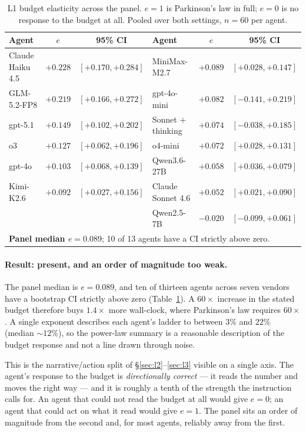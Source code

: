 \begin{table}[h]
\centering\small
\caption{L1 budget elasticity across the panel. $e = 1$ is Parkinson's law in
full; $e = 0$ is no response to the budget at all. Pooled over both settings,
$n = 60$ per agent.}
\label{tab:l1-elasticity}
\begin{tabular}{lcc|lcc}
\toprule
Agent & $e$ & 95\% CI & Agent & $e$ & 95\% CI \\
\midrule
Claude Haiku 4.5 & $+0.228$ & $[+0.170, +0.284]$ & MiniMax-M2.7   & $+0.089$ & $[+0.028, +0.147]$ \\
GLM-5.2-FP8      & $+0.219$ & $[+0.166, +0.272]$ & gpt-4o-mini    & $+0.082$ & $[-0.141, +0.219]$ \\
gpt-5.1          & $+0.149$ & $[+0.102, +0.202]$ & Sonnet $+$ thinking & $+0.074$ & $[-0.038, +0.185]$ \\
o3               & $+0.127$ & $[+0.062, +0.196]$ & o4-mini        & $+0.072$ & $[+0.028, +0.131]$ \\
gpt-4o           & $+0.103$ & $[+0.068, +0.139]$ & Qwen3.6-27B    & $+0.058$ & $[+0.036, +0.079]$ \\
Kimi-K2.6        & $+0.092$ & $[+0.027, +0.156]$ & Claude Sonnet 4.6 & $+0.052$ & $[+0.021, +0.090]$ \\
                 &          &                    & Qwen2.5-7B     & $-0.020$ & $[-0.099, +0.061]$ \\
\midrule
\multicolumn{6}{l}{\textbf{Panel median $e = 0.089$}; 10 of 13 agents have a CI strictly above zero.} \\
\bottomrule
\end{tabular}
\end{table}

\paragraph{Result: present, and an order of magnitude too weak.}
The panel median is $e = 0.089$, and ten of thirteen agents across seven
vendors have a bootstrap CI strictly above zero (Table~\ref{tab:l1-elasticity}).
A $60\times$ increase in the stated budget therefore buys $1.4\times$ more
wall-clock, where Parkinson's law requires $60\times$. A single exponent
describes each agent's ladder to between $3\%$ and $22\%$ (median ${\sim}12\%$),
so the power-law summary is a reasonable description of the budget response and
not a line drawn through noise.

This is the narrative/action split of \S\ref{sec:l2}--\ref{sec:l3} visible on a
single axis. The agent's response to the budget is \emph{directionally correct}
--- it reads the number and moves the right way --- and it is roughly a tenth of
the strength the instruction calls for. An agent that could not read the budget
at all would give $e = 0$; an agent that could act on what it read would give
$e = 1$. The panel sits an order of magnitude from the second and, for most
agents, reliably away from the first.

